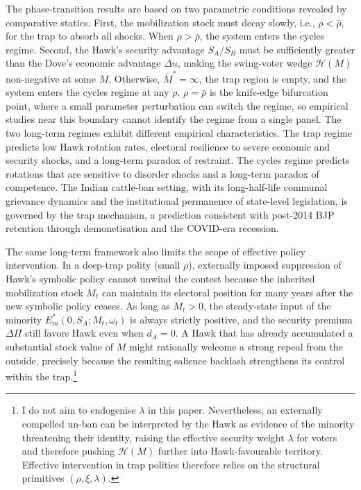 \documentclass[11pt,twoside]{extarticle}
\begin{document}
The phase-transition results are based on two parametric conditions revealed by comparative statics. First, the mobilization stock must decay slowly, i.e., $\rho < \bar\rho$, for the trap to absorb all shocks. When $\rho > \bar\rho$, the system enters the cycles regime. Second, the Hawk's security advantage $S_A/S_B$ must be sufficiently greater than the Dove's economic advantage $\Delta u$, making the swing-voter wedge $\mathcal H(M)$ non-negative at some $M$. Otherwise, $\bar M^* = \infty$, the trap region is empty, and the system enters the cycles regime at any $\rho$. $\rho = \bar\rho$ is the knife-edge bifurcation point, where a small parameter perturbation can switch the regime, so empirical studies near this boundary cannot identify the regime from a single panel. The two long-term regimes exhibit different empirical characteristics. The trap regime predicts low Hawk rotation rates, electoral resilience to severe economic and security shocks, and a long-term paradox of restraint. The cycles regime predicts rotations that are sensitive to disorder shocks and a long-term paradox of competence. The Indian cattle-ban setting, with its long-half-life communal grievance dynamics and the institutional permanence of state-level legislation, is governed by the trap mechanism, a prediction consistent with post-2014 BJP retention through demonetisation and the COVID-era recession.

The same long-term framework also limits the scope of effective policy intervention. In a deep-trap polity (small $\rho$), externally imposed suppression of Hawk's symbolic policy cannot unwind the contest because the inherited mobilization stock $M_t$ can maintain its electoral position for many years after the new symbolic policy ceases. As long as $M_t>0$, the steady-state input of the minority $E_m^*(0,S_A;M_t,\omega_t)$ is always strictly positive, and the security premium $\Delta\Pi$ still favors Hawk even when $d_A=0$. A Hawk that has already accumulated a substantial stock value of $M$ might rationally welcome a strong repeal from the outside, precisely because the resulting salience backlash strengthens its control within the trap.\footnote{I do not aim to endogenise $\lambda$ in this paper. Nevertheless, an externally compelled un-ban can be interpreted by the Hawk as evidence of the minority threatening their identity, raising the effective security weight $\lambda$ for voters and therefore pushing $\mathcal H(M)$ further into Hawk-favourable territory. Effective intervention in trap polities therefore relies on the structural primitives $(\rho,\xi,\lambda)$.}
\end{document}
